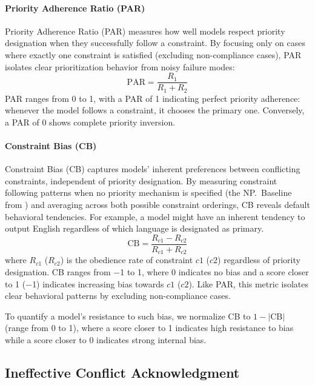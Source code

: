 \paragraph{Priority Adherence Ratio (PAR)} Priority Adherence Ratio (PAR) measures how well models respect priority designation when they successfully follow a constraint. By focusing only on cases where exactly one constraint is satisfied (excluding non-compliance cases), PAR isolates clear prioritization behavior from noisy failure modes:
\begin{equation}
\text{PAR} = \frac{R_1}{R_1 + R_2}
\label{eq:par}
\end{equation}
PAR ranges from 0 to 1, with a PAR of 1 indicating perfect priority adherence: whenever the model follows a constraint, it chooses the primary one. Conversely, a PAR of 0 shows complete priority inversion.


\paragraph{Constraint Bias (CB)} 

Constraint Bias (CB) captures models' inherent preferences between conflicting constraints, independent of priority designation. By measuring constraint following patterns when no priority mechanism is specified (the NP.\ Baseline from ) and averaging across both possible constraint orderings, CB reveals default behavioral tendencies. For example, a model might have an inherent tendency to output English regardless of which language is designated as primary.  
\begin{equation}
\text{CB} = \frac{R_{c1} - R_{c2}}{R_{c1} + R_{c2}}
\label{eq:cb}
\end{equation}
where $R_{c1}$ ($R_{c2}$) is the obedience rate of constraint $c1$ ($c2$) regardless of priority designation. CB ranges from $-$1 to 1, where 0 indicates no bias and a score closer to 1 ($-$1) indicates increasing bias towards $c1$ ($c2$). Like PAR, this metric isolates clear behavioral patterns by excluding non-compliance cases.

To quantify a model's resistance to such bias, we normalize CB to $1 - |\text{CB}|$ (range from 0 to 1), where a score closer to 1 indicates high resistance to bias while a score closer to 0 indicates strong internal bias.


\subsection{Ineffective Conflict Acknowledgment} \label{sec:conflict_acknowledgement}

